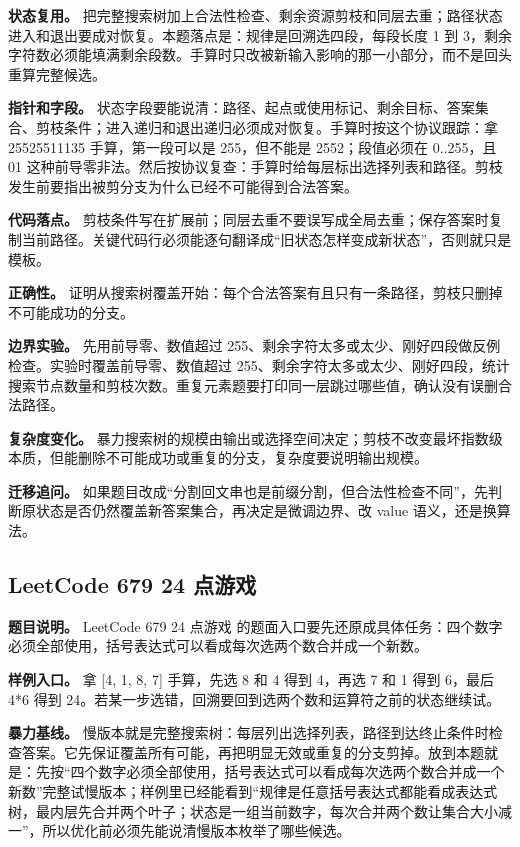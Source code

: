 \textbf{状态复用。} 把完整搜索树加上合法性检查、剩余资源剪枝和同层去重；路径状态进入和退出要成对恢复。本题落点是：规律是回溯选四段，每段长度 1 到 3，剩余字符数必须能填满剩余段数。手算时只改被新输入影响的那一小部分，而不是回头重算完整候选。

\textbf{指针和字段。} 状态字段要能说清：路径、起点或使用标记、剩余目标、答案集合、剪枝条件；进入递归和退出递归必须成对恢复。手算时按这个协议跟踪：拿 25525511135 手算，第一段可以是 255，但不能是 2552；段值必须在 0..255，且 01 这种前导零非法。然后按协议复查：手算时给每层标出选择列表和路径。剪枝发生前要指出被剪分支为什么已经不可能得到合法答案。

\textbf{代码落点。} 剪枝条件写在扩展前；同层去重不要误写成全局去重；保存答案时复制当前路径。关键代码行必须能逐句翻译成“旧状态怎样变成新状态”，否则就只是模板。

\textbf{正确性。} 证明从搜索树覆盖开始：每个合法答案有且只有一条路径，剪枝只删掉不可能成功的分支。

\textbf{边界实验。} 先用前导零、数值超过 255、剩余字符太多或太少、刚好四段做反例检查。实验时覆盖前导零、数值超过 255、剩余字符太多或太少、刚好四段，统计搜索节点数量和剪枝次数。重复元素题要打印同一层跳过哪些值，确认没有误删合法路径。

\textbf{复杂度变化。} 暴力搜索树的规模由输出或选择空间决定；剪枝不改变最坏指数级本质，但能删除不可能成功或重复的分支，复杂度要说明输出规模。

\textbf{迁移追问。} 如果题目改成“分割回文串也是前缀分割，但合法性检查不同”，先判断原状态是否仍然覆盖新答案集合，再决定是微调边界、改 value 语义，还是换算法。

\subsection{LeetCode 679 24 点游戏}

\textbf{题目说明。} LeetCode 679 24 点游戏 的题面入口要先还原成具体任务：四个数字必须全部使用，括号表达式可以看成每次选两个数合并成一个新数。

\textbf{样例入口。} 拿 [4, 1, 8, 7] 手算，先选 8 和 4 得到 4，再选 7 和 1 得到 6，最后 4*6 得到 24。若某一步选错，回溯要回到选两个数和运算符之前的状态继续试。

\textbf{暴力基线。} 慢版本就是完整搜索树：每层列出选择列表，路径到达终止条件时检查答案。它先保证覆盖所有可能，再把明显无效或重复的分支剪掉。放到本题就是：先按“四个数字必须全部使用，括号表达式可以看成每次选两个数合并成一个新数”完整试慢版本；样例里已经能看到“规律是任意括号表达式都能看成表达式树，最内层先合并两个叶子；状态是一组当前数字，每次合并两个数让集合大小减一”，所以优化前必须先能说清慢版本枚举了哪些候选。

